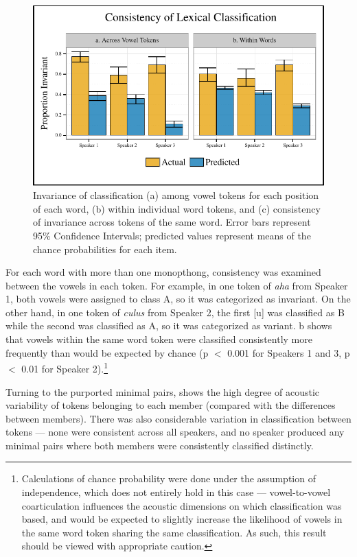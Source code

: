 \documentclass[output=paper
,newtxmath
,modfonts
,nonflat]{langsci/langscibook}
\begin{document}
\begin{figure}
\includegraphics[scale=1]{figures/lexclass.pdf}
\caption{Invariance of classification (a) among vowel tokens for each position of each word, (b) within individual word tokens, and (c) consistency of invariance across tokens of the same word.  Error bars represent 95\% Confidence Intervals; predicted values represent means of the chance probabilities for each item.}
\label{fig:kbgy:4}
\end{figure}

For each word with more than one monopthong, consistency was examined between the vowels in each token.  For example, in one token of \emph{aha} from Speaker 1, both vowels were assigned to class A, so it was categorized as invariant.  On the other hand, in one token of \emph{culus} from Speaker 2, the first [u] was classified as B while the second was classified as A, so it was categorized as variant.  b shows that vowels within the same word token were classified consistently more frequently than would be expected by chance (p $<$ 0.001 for Speakers 1 and 3, p $<$ 0.01 for Speaker 2).\footnote{Calculations of chance probability were done under the assumption of independence, which does not entirely hold in this case --- vowel-to-vowel coarticulation influences the acoustic dimensions on which classification was based, and would be expected to slightly increase the likelihood of vowels in the same word token sharing the same classification.  As such, this result should be viewed with appropriate caution.}

Turning to the purported minimal pairs,  shows the high degree of  acoustic variability of tokens belonging to each member (compared with the differences between members).  There was also considerable variation in classification between tokens --- none were consistent across all speakers, and no speaker produced any minimal pairs where both members were consistently classified distinctly. 
\end{document}
